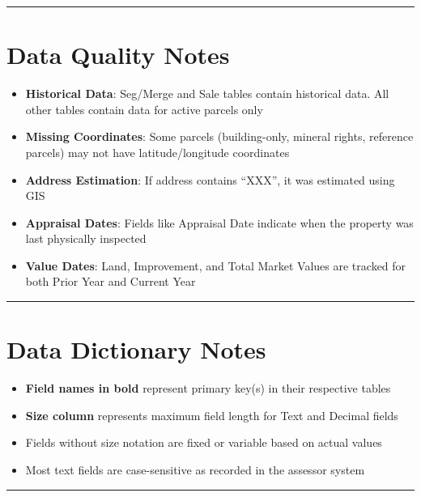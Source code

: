 \documentclass[
  english,
  letterpaper,
  DIV=11,
  numbers=noendperiod]{scrreprt}
\providecommand{\tightlist}{%
  \setlength{\itemsep}{0pt}\setlength{\parskip}{0pt}}
\begin{document}
\begin{center}\rule{0.5\linewidth}{0.5pt}\end{center}

\section{Data Quality Notes}\label{data-quality-notes}

\begin{itemize}
\tightlist
\item
  \textbf{Historical Data}: Seg/Merge and Sale tables contain historical
  data. All other tables contain data for active parcels only
\item
  \textbf{Missing Coordinates}: Some parcels (building-only, mineral
  rights, reference parcels) may not have latitude/longitude coordinates
\item
  \textbf{Address Estimation}: If address contains ``XXX'', it was
  estimated using GIS
\item
  \textbf{Appraisal Dates}: Fields like Appraisal Date indicate when the
  property was last physically inspected
\item
  \textbf{Value Dates}: Land, Improvement, and Total Market Values are
  tracked for both Prior Year and Current Year
\end{itemize}

\begin{center}\rule{0.5\linewidth}{0.5pt}\end{center}

\section{Data Dictionary Notes}\label{data-dictionary-notes}

\begin{itemize}
\tightlist
\item
  \textbf{Field names in bold} represent primary key(s) in their
  respective tables
\item
  \textbf{Size column} represents maximum field length for Text and
  Decimal fields
\item
  Fields without size notation are fixed or variable based on actual
  values
\item
  Most text fields are case-sensitive as recorded in the assessor system
\end{itemize}

\begin{center}\rule{0.5\linewidth}{0.5pt}\end{center}
\end{document}
